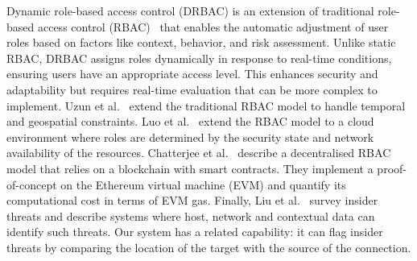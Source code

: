 Dynamic role-based access control (DRBAC) is an extension of
traditional role-based access control
(RBAC)~\cite{franqueira-wieringa-12} that enables the automatic
adjustment of user roles based on factors like context, behavior, and
risk assessment.  Unlike static RBAC, DRBAC assigns roles dynamically
in response to real-time conditions, ensuring users have an
appropriate access level.  This enhances security and adaptability but
requires real-time evaluation that can be more complex to implement.
Uzun et al.~\cite{uzun-et-al-12} extend the traditional RBAC model to
handle temporal and geospatial constraints.  Luo et
al.~\cite{luo-et-al-16} extend the RBAC model to a cloud environment
where roles are determined by the security state and network
availability of the resources.  Chatterjee et
al.~\cite{chatterjee-et-al-20} describe a decentralised RBAC model
that relies on a blockchain with smart contracts.  They implement a
proof-of-concept on the Ethereum virtual machine (EVM) and quantify
its computational cost in terms of EVM gas.  Finally, Liu et
al.~\cite{liu-et-al-18} survey insider threats and describe systems
where host, network and contextual data can identify such threats.
Our system has a related capability: it can flag insider threats by
comparing the location of the target with the source of the
connection.

